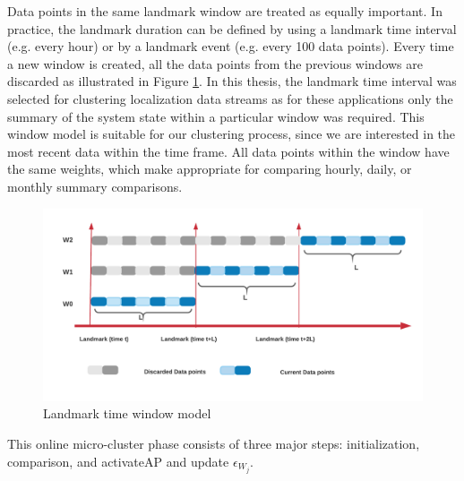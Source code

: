 Data points in the same landmark window are treated as equally important. In practice, the landmark duration can be defined by using a landmark time interval (e.g. every hour) or by a landmark event (e.g. every 100 data points). Every time a new window is created, all the data points from the previous windows are discarded as illustrated in Figure \ref{land}. In this thesis, the landmark time interval was selected for clustering localization data streams as for these applications only the summary of the system state within a particular window was required. This window model is suitable for our clustering process, since we are interested in the most recent data within the time frame. All data points within the window have the same weights, which make appropriate for comparing hourly, daily, or monthly summary comparisons. 




   \begin{figure}[!h]
    \centering
    \includegraphics[width = 11 cm]{image/LANDMARK-2.png}
    \caption{Landmark time window model }
    \label{land}
    \end{figure}
 
This online micro-cluster phase consists of three major steps: initialization, comparison, and activateAP and update $\epsilon_{W_j}$. %



  
